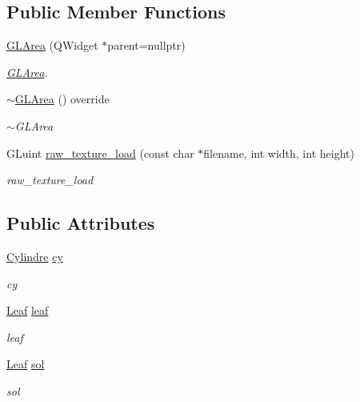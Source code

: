 \subsection*{Public Member Functions}
\begin{DoxyCompactItemize}
\item 
\hyperlink{classGLArea_a999988e18caf705bcd41acb09a8dcc8e}{G\+L\+Area} (Q\+Widget $\ast$parent=nullptr)
\begin{DoxyCompactList}\small\item\em \hyperlink{classGLArea}{G\+L\+Area}. \end{DoxyCompactList}\item 
\hyperlink{classGLArea_afa9c60f160f51d8ff4af29e602792722}{$\sim$\+G\+L\+Area} () override
\begin{DoxyCompactList}\small\item\em $\sim$\+G\+L\+Area \end{DoxyCompactList}\item 
G\+Luint \hyperlink{classGLArea_ac4f7a48d46be9e7c6e63b16b5c3c6441}{raw\+\_\+texture\+\_\+load} (const char $\ast$filename, int width, int height)
\begin{DoxyCompactList}\small\item\em raw\+\_\+texture\+\_\+load \end{DoxyCompactList}\end{DoxyCompactItemize}
\subsection*{Public Attributes}
\begin{DoxyCompactItemize}
\item 
\mbox{\label{classGLArea_a00eaf00791d40aab84a8b842d91d2987}} 
\hyperlink{classCylindre}{Cylindre} \hyperlink{classGLArea_a00eaf00791d40aab84a8b842d91d2987}{cy}
\begin{DoxyCompactList}\small\item\em cy \end{DoxyCompactList}\item 
\mbox{\label{classGLArea_a5e7246cc8fd27dcc4a7d1c32919c1bba}} 
\hyperlink{classLeaf}{Leaf} \hyperlink{classGLArea_a5e7246cc8fd27dcc4a7d1c32919c1bba}{leaf}
\begin{DoxyCompactList}\small\item\em leaf \end{DoxyCompactList}\item 
\mbox{\label{classGLArea_a94eee49b2f64ec207bc4a952c79ef96e}} 
\hyperlink{classLeaf}{Leaf} \hyperlink{classGLArea_a94eee49b2f64ec207bc4a952c79ef96e}{sol}
\begin{DoxyCompactList}\small\item\em sol \end{DoxyCompactList}\end{DoxyCompactItemize}
